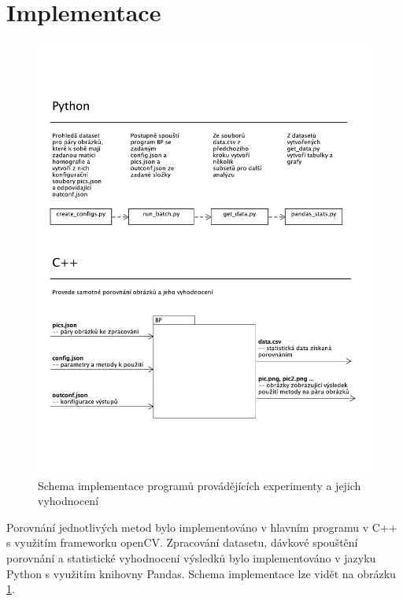 

\section{Implementace}

\begin{figure}[!htp] 
	\centering
	\includegraphics[width=6in]{img/impl_uml.pdf}
	\caption{Schema implementace programů provádějících experimenty a jejich vyhodnocení} \label{impl_uml}
\end{figure}

Porovnání jednotlivých metod bylo implementováno v hlavním programu v C++ s využitím frameworku openCV. Zpracování datasetu, dávkové spouštění porovnání a statistické vyhodnocení výsledků bylo implementováno v jazyku Python s využitím knihovny Pandas. Schema implementace lze vidět na obrázku \ref{impl_uml}.


